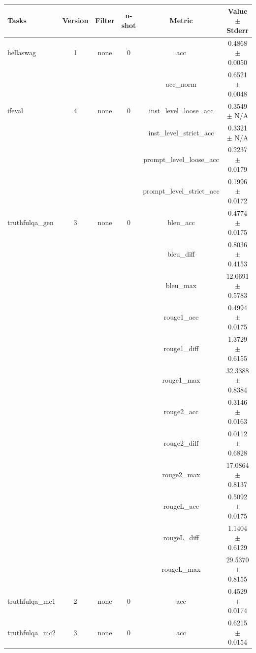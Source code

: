 \documentclass{ifacconf}
\begin{document}
\begin{strip}
\begin{minipage}{\textwidth}
    \begin{table}[H]
    \centering
    \begin{tabular}{|l|c|c|c|c|c|}
    \hline
    \textbf{Tasks} & \textbf{Version} & \textbf{Filter} & \textbf{n-shot} & \textbf{Metric} & \textbf{Value} $\pm$ \textbf{Stderr} \\ \hline
    hellaswag & 1 & none & 0 & acc & 0.4868 $\pm$ 0.0050 \\ \hline
    & & & & acc\_norm & 0.6521 $\pm$ 0.0048 \\ \hline
    ifeval & 4 & none & 0 & inst\_level\_loose\_acc & 0.3549 $\pm$ N/A \\ \hline
    & & & & inst\_level\_strict\_acc & 0.3321 $\pm$ N/A \\ \hline
    & & & & prompt\_level\_loose\_acc & 0.2237 $\pm$ 0.0179 \\ \hline
    & & & & prompt\_level\_strict\_acc & 0.1996 $\pm$ 0.0172 \\ \hline
    truthfulqa\_gen & 3 & none & 0 & bleu\_acc & 0.4774 $\pm$ 0.0175 \\ \hline
    & & & & bleu\_diff & 0.8036 $\pm$ 0.4153 \\ \hline
    & & & & bleu\_max & 12.0691 $\pm$ 0.5783 \\ \hline
    & & & & rouge1\_acc & 0.4994 $\pm$ 0.0175 \\ \hline
    & & & & rouge1\_diff & 1.3729 $\pm$ 0.6155 \\ \hline
    & & & & rouge1\_max & 32.3388 $\pm$ 0.8384 \\ \hline
    & & & & rouge2\_acc & 0.3146 $\pm$ 0.0163 \\ \hline
    & & & & rouge2\_diff & 0.0112 $\pm$ 0.6828 \\ \hline
    & & & & rouge2\_max & 17.0864 $\pm$ 0.8137 \\ \hline
    & & & & rougeL\_acc & 0.5092 $\pm$ 0.0175 \\ \hline
    & & & & rougeL\_diff & 1.1404 $\pm$ 0.6129 \\ \hline
    & & & & rougeL\_max & 29.5370 $\pm$ 0.8155 \\ \hline
    truthfulqa\_mc1 & 2 & none & 0 & acc & 0.4529 $\pm$ 0.0174 \\ \hline
    truthfulqa\_mc2 & 3 & none & 0 & acc & 0.6215 $\pm$ 0.0154 \\ \hline
    \end{tabular}
    \label{tab:gemma2_q6k}
    \end{table}


\end{minipage}
\end{strip}
\end{document}
